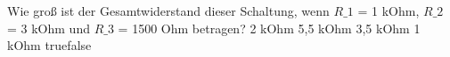    {Wie groß ist der Gesamtwiderstand dieser Schaltung, wenn $R\_1$ = 1 kOhm, $R\_2$ = 3 kOhm und $R\_3$ = 1500 Ohm betragen?}
    {2 kOhm}
    {5,5 kOhm}
    {3,5 kOhm}
    {1 kOhm}
    {true}{false}